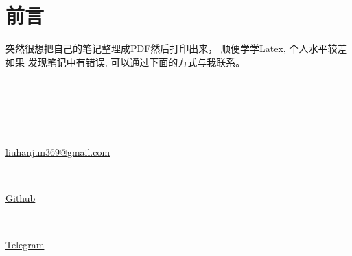 \chapter{前言}

突然很想把自己的笔记整理成PDF然后打印出来， 顺便学学Latex, 个人水平较差如果
发现笔记中有错误, 可以通过下面的方式与我联系。
\\
\\
\\
\\
\\
\\ \centerline{\href{mailto:liuhanjun369@gmail.com}{liuhanjun369@gmail.com} }\\
\centerline{\href{https://www.github.com/etcartman}{Github}} \\
\centerline{\href{https://t.me/lhj369}{Telegram}}


